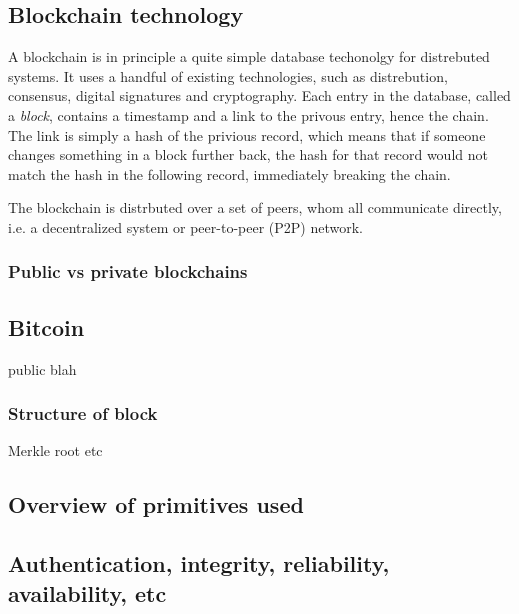 
\subsection{Blockchain technology}

A blockchain is in principle a quite simple database techonolgy for
distrebuted systems. It uses a handful of existing technologies, such
as distrebution, consensus, digital signatures and cryptography.  Each
entry in the database, called a \textit{block}, contains a timestamp
and a link to the privous entry, hence the chain. The link is simply a
hash of the privious record, which means that if someone changes
something in a block further back, the hash for that record would not
match the hash in the following record, immediately breaking the
chain.

The blockchain is distrbuted over a set of peers, whom all communicate
directly, i.e. a decentralized system or peer-to-peer (P2P) network.

\subsubsection{Public vs private blockchains}

\subsection{Bitcoin}
public blah

\subsubsection{Structure of block}
Merkle root etc

\subsection{Overview of primitives used}

\subsection{Authentication, integrity, reliability, availability, etc}
